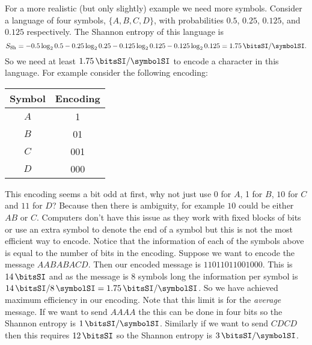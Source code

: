     For a more realistic (but only slightly) example we need more symbols.
    Consider a language of four symbols, \(\{A, B, C, D\}\), with  probabilities \(0.5\), \(0.25\), \(0.125\), and \(0.125\) respectively.
    The Shannon entropy of this language is
    \[\shannonEntropy = -0.5\log_20.5 - 0.25\log_20.25 - 0.125\log_20.125 - 0.125\log_20.125 = \SI{1.75}{\bitsSI/\symbolSI}.\]
    So we need at least \(\SI{1.75}{\bitsSI/\symbolSI}\) to encode a character in this language.
    For example consider the following encoding:
    \begin{center}
        \begin{tabular}{cc}\hline
            Symbol & Encoding\\\hline
            \(A\) & 1\\
            \(B\) & 01\\
            \(C\) & 001\\
            \(D\) & 000\\\hline
        \end{tabular}
    \end{center}
    This encoding seems a bit odd at first, why not just use \(0\) for \(A\), 1 for \(B\), \(10\) for \(C\) and \(11\) for \(D\)?
    Because then there is ambiguity, for example \(10\) could be either \(AB\) or \(C\).
    Computers don't have this issue as they work with fixed blocks of bits or use an extra symbol to denote the end of a symbol but this is not the most efficient way to encode.
    Notice that the information of each of the symbols above is equal to the number of bits in the encoding.
    Suppose we want to encode the message \(AABABACD\).
    Then our encoded message is \(11011011001000\).
    This is \(\SI{14}{\bitsSI}\) and as the message is 8 symbols long the information per symbol is \(\SI{14}{\bitsSI}/\SI{8}{\symbolSI} = \SI{1.75}{\bitsSI/\symbolSI}\).
    So we have achieved maximum efficiency in our encoding.
    Note that this limit is for the \emph{average} message.
    If we want to send \(AAAA\) the this can be done in four bits so the Shannon entropy is \(\SI{1}{\bitsSI/\symbolSI}\).
    Similarly if we want to send \(CDCD\) then this requires \(\SI{12}{\bitsSI}\) so the Shannon entropy is \(\SI{3}{\bitsSI/\symbolSI}\).
    
